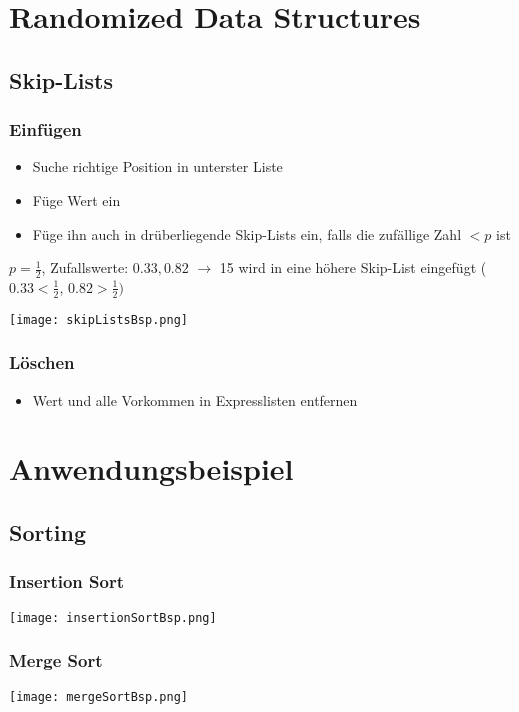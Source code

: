 \section*{Randomized Data Structures}
\subsection*{Skip-Lists}
\subsubsection*{Einfügen}
\begin{itemize}
    \item Suche richtige Position in unterster Liste
    \item Füge Wert ein
    \item Füge ihn auch in drüberliegende Skip-Lists ein, falls die zufällige Zahl $< p$ ist
\end{itemize}
\centerline{$p= \frac{1}{2}$, Zufallswerte: $0.33,0.82$ $\rightarrow$ 15 wird in eine höhere Skip-List eingefügt ($0.33 < \frac{1}{2}$, $0.82 > \frac{1}{2})$}
\centerline{\texttt{[image: skipListsBsp.png]}}

\subsubsection*{Löschen}
\begin{itemize}
    \item Wert und alle Vorkommen in Expresslisten entfernen
\end{itemize}


\pagebreak

\section*{Anwendungsbeispiel}

\subsection*{Sorting}

\subsubsection*{Insertion Sort}
\centerline{\texttt{[image: insertionSortBsp.png]}}

\subsubsection*{Merge Sort}
\centerline{\texttt{[image: mergeSortBsp.png]}}

